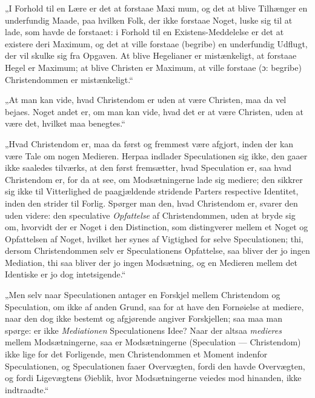 „I Forhold til en Lære er det at forstaae Maxi%
mum, og det at blive Tilhænger en underfundig Maade, paa hvilken
Folk, der ikke forstaae Noget, luske sig til at lade, som havde de
forstaaet: i Forhold til en Existens-Meddelelse er det at existere
deri Maximum, og det at ville forstaae (begribe) en underfundig
Udflugt, der vil skulke sig fra Opgaven. At blive Hegelianer er
mistænkeligt, at forstaae Hegel er Maximum; at blive Christen er
Maximum, at ville forstaae (ɔ: begribe) Christendommen er
mistænkeligt.“

„At man kan vide, hvad Christendom er uden at være Christen, maa
da vel bejaes. Noget andet er, om man kan vide, hvad det er at
være Christen, uden at være det, hvilket maa benegtes.“

„Hvad Christendom er, maa da først og fremmest være afgjort, inden
der kan være Tale om nogen Medieren. Herpaa indlader Speculationen
sig ikke, den gaaer ikke saaledes tilværks, at den først
fremsætter, hvad Speculation er, saa hvad Christendom er, for da
at see, om Modsætningerne lade sig mediere; den sikkrer sig ikke
til Vitterlighed de paagjældende stridende Parters respective
Identitet, inden den strider til Forlig. Spørger man den, hvad
Christendom er, svarer den uden videre: den speculative
\emph{Opfattelse} af Christendommen, uden at bryde sig om, hvorvidt der
er Noget i den Distinction, som distingverer mellem et Noget og
Opfattelsen af Noget, hvilket her synes af Vigtighed for selve
Speculationen; thi, dersom Christendommen selv er Speculationens
Opfattelse, saa bliver der jo ingen
 Mediation, thi saa bliver der jo ingen Modsætning, og en Medieren
mellem det Identiske er jo dog intetsigende.“

„Men selv naar Speculationen antager en Forskjel mellem
Christendom og Speculation, om ikke af anden Grund, saa for at
have den Fornøielse at mediere, naar den dog ikke bestemt og
afgjørende angiver Forskjellen; saa maa man spørge: er ikke
\emph{Mediationen} Speculationens Idee? Naar der altsaa
\emph{medieres} mellem Modsætningerne, saa er Modsætningerne
(Speculation --- Christendom) ikke lige for det Forligende, men
Christendommen et Moment indenfor Speculationen, og Speculationen
faaer Overvægten, fordi den havde Overvægten, og fordi
Ligevægtens Øieblik, hvor Modsætningerne veiedes mod hinanden,
ikke indtraadte.“

